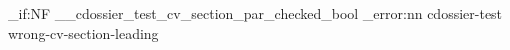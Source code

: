 \documentclass{careerdossier-cv}
\begin{document}
\ExplSyntaxOn
\bool_if:NF \g__cdossier_test_cv_section_par_checked_bool
  { \msg_error:nn { cdossier-test } { wrong-cv-section-leading } }
\ExplSyntaxOff
\end{document}
